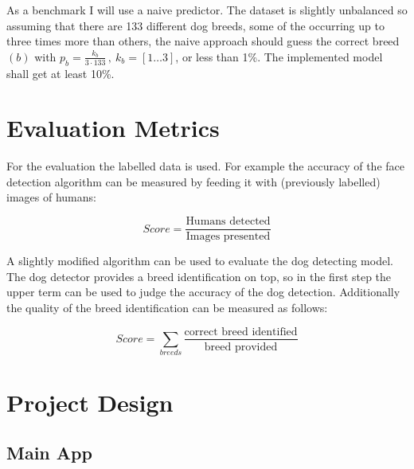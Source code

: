 \documentclass[paper=A4, DIV=10, parskip=half]{scrartcl}
\begin{document}
As a benchmark I will use a naive predictor. The dataset is slightly unbalanced so
assuming that there are 133 different dog breeds, some of the occurring up to three times
more than others, the naive approach should guess the correct breed $(b)$ with
$p_{b}=\frac{k_{b}}{3\cdot133}\,,\:k_{b}=\left[1\ldots3\right]$, or less than 1\%. The
implemented model shall get at least 10\%.


\section*{Evaluation Metrics}

For the evaluation the labelled data is used. For example the accuracy of the face
detection algorithm can be measured by feeding it with (previously labelled) images of
humans: 

$$ Score = \frac{\textrm{Humans detected}}{\textrm{Images presented}}$$

A slightly modified algorithm can be used to evaluate the dog detecting model. The dog
detector provides a breed identification on top, so in the first step the upper term can
be used to judge the accuracy of the dog detection. Additionally the quality of the breed
identification can be measured as follows:

$$ Score = \sum_{breeds}{\frac{\textrm{correct breed identified}}{\textrm{breed provided}}} $$


\section*{Project Design}

\subsection*{Main App}
\end{document}
